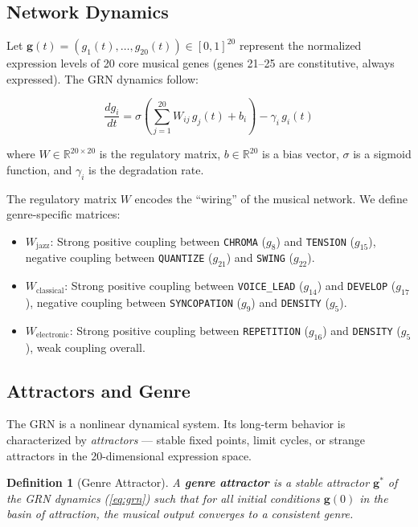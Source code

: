 \documentclass[11pt,a4paper]{article}
\newtheorem{definition}{Definition}[section]
\newcommand{\R}{\mathbb{R}}
\begin{document}
\subsection{Network Dynamics}

Let $\mathbf{g}(t) = (g_1(t), \ldots, g_{20}(t)) \in [0,1]^{20}$ represent the normalized expression levels of 20 core musical genes (genes 21--25 are constitutive, always expressed). The GRN dynamics follow:

\begin{equation}\label{eq:grn}
  \frac{dg_i}{dt} = \sigma\!\left(\sum_{j=1}^{20} W_{ij} \, g_j(t) + b_i\right) - \gamma_i \, g_i(t)
\end{equation}

where $W \in \R^{20 \times 20}$ is the regulatory matrix, $b \in \R^{20}$ is a bias vector, $\sigma$ is a sigmoid function, and $\gamma_i$ is the degradation rate.

The regulatory matrix $W$ encodes the ``wiring'' of the musical network. We define genre-specific matrices:
\begin{itemize}
  \item $W_{\text{jazz}}$: Strong positive coupling between \texttt{CHROMA} ($g_8$) and \texttt{TENSION} ($g_{15}$), negative coupling between \texttt{QUANTIZE} ($g_{21}$) and \texttt{SWING} ($g_{22}$).
  \item $W_{\text{classical}}$: Strong positive coupling between \texttt{VOICE\_LEAD} ($g_{14}$) and \texttt{DEVELOP} ($g_{17}$), negative coupling between \texttt{SYNCOPATION} ($g_9$) and \texttt{DENSITY} ($g_5$).
  \item $W_{\text{electronic}}$: Strong positive coupling between \texttt{REPETITION} ($g_{16}$) and \texttt{DENSITY} ($g_5$), weak coupling overall.
\end{itemize}

\subsection{Attractors and Genre}

The GRN is a nonlinear dynamical system. Its long-term behavior is characterized by \emph{attractors} --- stable fixed points, limit cycles, or strange attractors in the 20-dimensional expression space.

\begin{definition}[Genre Attractor]\label{def:genre}
A \textbf{genre attractor} is a stable attractor $\mathbf{g}^*$ of the GRN dynamics (\ref{eq:grn}) such that for all initial conditions $\mathbf{g}(0)$ in the basin of attraction, the musical output converges to a consistent genre.
\end{definition}
\end{document}
